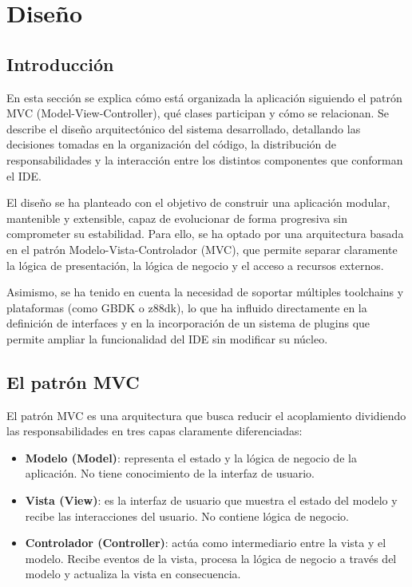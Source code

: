 \documentclass[../main.tex]{subfiles}
\begin{document}
\chapter{Diseño}
\label{C:diseno}

\section{Introducción}

En esta sección se explica cómo está organizada la aplicación siguiendo el patrón MVC (Model-View-Controller), qué clases participan y cómo se relacionan. Se describe el diseño arquitectónico del sistema desarrollado, detallando las decisiones tomadas en la organización del código, la distribución de responsabilidades y la interacción entre los distintos componentes que conforman el IDE.

El diseño se ha planteado con el objetivo de construir una aplicación modular, mantenible y extensible, capaz de evolucionar de forma progresiva sin comprometer su estabilidad. Para ello, se ha optado por una arquitectura basada en el patrón Modelo-Vista-Controlador (MVC), que permite separar claramente la lógica de presentación, la lógica de negocio y el acceso a recursos externos.

Asimismo, se ha tenido en cuenta la necesidad de soportar múltiples toolchains y plataformas (como GBDK o z88dk), lo que ha influido directamente en la definición de interfaces y en la incorporación de un sistema de plugins que permite ampliar la funcionalidad del IDE sin modificar su núcleo.
 
\section{El patrón MVC}

El patrón MVC es una arquitectura que busca reducir el acoplamiento dividiendo las responsabilidades en tres capas claramente diferenciadas:

\begin{itemize}
    \item \textbf{Modelo (Model)}: representa el estado y la lógica de negocio de la aplicación. No tiene conocimiento de la interfaz de usuario.
    \item \textbf{Vista (View)}: es la interfaz de usuario que muestra el estado del modelo y recibe las interacciones del usuario. No contiene lógica de negocio.
    \item \textbf{Controlador (Controller)}: actúa como intermediario entre la vista y el modelo. Recibe eventos de la vista, procesa la lógica de negocio a través del modelo y actualiza la vista en consecuencia.
\end{itemize}
\clearpage
\end{document}

